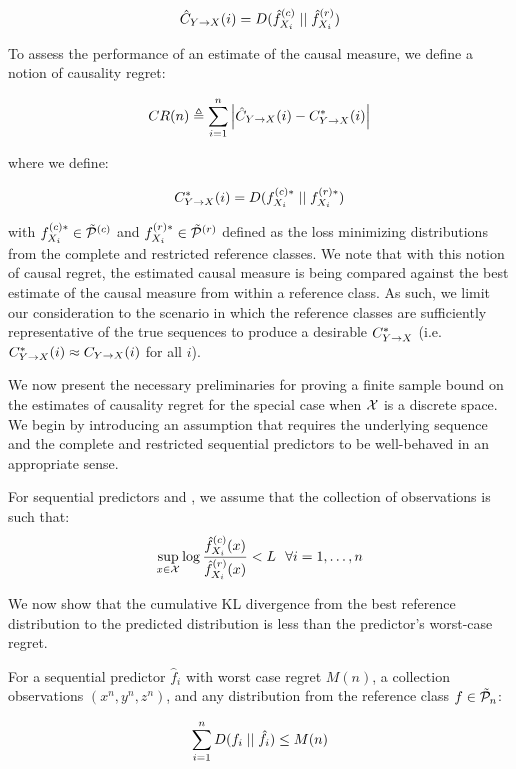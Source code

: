 \begin{equation}
\hat{C}_{Y\rightarrow X}(i) = D(\hat{f}_{X_i}^{(c)} \mid \mid \hat{f}_{X_i}^{(r)})
\end{equation}

To assess the performance of an estimate of the causal measure, we define a notion of causality regret:

\begin{equation}
CR(n) \triangleq \sum_{i=1}^n \left| \hat{C}_{Y\rightarrow X}(i) - C^*_{Y\rightarrow X}(i)  \right|
\end{equation}

\noindent where we define:

\begin{equation}
C^*_{Y\rightarrow X}(i) = D(f_{X_i}^{(c)*} \mid \mid f_{X_i}^{(r)*})
\end{equation}

\noindent with $f_{X_i}^{(c)*} \in \tilde{\mathcal{P}}^{(c)}$ and $f_{X_i}^{(r)*} \in \tilde{\mathcal{P}}^{(r)}$ defined as the loss minimizing distributions from the complete and restricted reference classes. We note that with this notion of causal regret, the estimated causal measure is being compared against the best estimate of the causal measure from within a reference class. As such, we limit our consideration to the scenario in which the reference classes are sufficiently representative of the true sequences to produce a desirable $C^*_{Y\rightarrow X}$ (i.e. $C^*_{Y\rightarrow X}(i) \approx C_{Y\rightarrow X}(i)$ for all $i$).

We now present the necessary preliminaries for proving a finite sample bound on the estimates of causality regret for the special case when $\mathcal{X}$ is a discrete space. We begin by introducing an assumption that requires the underlying sequence and the complete and restricted sequential predictors to be well-behaved in an appropriate sense.

\begin{assumption} \label{assumption:gbound}
For sequential predictors  and , we assume that the collection of observations is such that:
\begin{equation}
\sup_{x \in \mathcal{X}} \log \frac{\hat{f}_{X_i}^{(c)}(x)}{\hat{f}_{X_i}^{(r)}(x)} < L \ \ \forall i=1,\dots,n
\end{equation}
\end{assumption}

We now show that the cumulative KL divergence from the best reference distribution to the predicted distribution is less than the predictor's worst-case regret.

\begin{lemma}\label{lemma:kl}
For a sequential predictor $\hat{f}_i$ with worst case regret $M(n)$, a collection observations $(x^n,y^n,z^n)$, and any distribution from the reference class $f \in \tilde{\mathcal{P}}_n$:

\begin{equation}
\sum_{i=1}^n D(f_i \mid \mid \hat{f}_i)\le M(n)
\end{equation}
\end{lemma}

